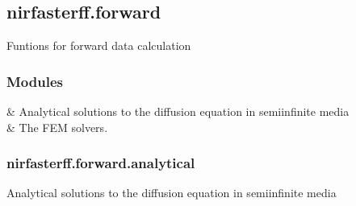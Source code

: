 \documentclass[letterpaper,10pt,english]{sphinxmanual}
\begin{document}
\sphinxstepscope


\subsection{nirfasterff.forward}
\label{\detokenize{_autosummary/nirfasterff.forward:module-nirfasterff.forward}}\label{\detokenize{_autosummary/nirfasterff.forward:nirfasterff-forward}}\label{\detokenize{_autosummary/nirfasterff.forward::doc}}
\sphinxAtStartPar
Funtions for forward data calculation
\subsubsection*{Modules}


\begin{savenotes}\sphinxattablestart
\sphinxthistablewithglobalstyle
\sphinxthistablewithnovlinesstyle
\centering
\begin{tabulary}{\linewidth}[t]{}
\sphinxtoprule
\sphinxtableatstartofbodyhook
\sphinxAtStartPar
{\hyperref[\detokenize{_autosummary/nirfasterff.forward.analytical:module-nirfasterff.forward.analytical}]{}}
&
\sphinxAtStartPar
Analytical solutions to the diffusion equation in semi\sphinxhyphen{}infinite media
\\
\sphinxhline
\sphinxAtStartPar
{\hyperref[\detokenize{_autosummary/nirfasterff.forward.femdata:module-nirfasterff.forward.femdata}]{}}
&
\sphinxAtStartPar
The FEM solvers.
\\
\sphinxbottomrule
\end{tabulary}
\sphinxtableafterendhook\par
\sphinxattableend\end{savenotes}

\sphinxstepscope


\subsubsection{nirfasterff.forward.analytical}
\label{\detokenize{_autosummary/nirfasterff.forward.analytical:module-nirfasterff.forward.analytical}}\label{\detokenize{_autosummary/nirfasterff.forward.analytical:nirfasterff-forward-analytical}}\label{\detokenize{_autosummary/nirfasterff.forward.analytical::doc}}
\sphinxAtStartPar
Analytical solutions to the diffusion equation in semi\sphinxhyphen{}infinite media
\end{document}

